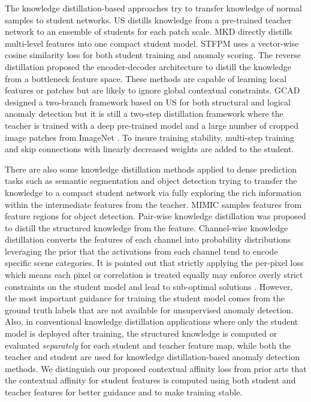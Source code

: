 \documentclass[10pt,twocolumn,letterpaper]{article}
\begin{document}
The knowledge distillation-based approaches try to transfer knowledge of normal samples to student networks. US \cite{bergmann2020uninformed} distills knowledge from a pre-trained teacher network to an ensemble of students for each patch scale. MKD \cite{salehi2021multiresolution} directly distills multi-level features into one compact student model. STFPM \cite{wang2021student} uses a vector-wise cosine similarity loss for both student training and anomaly scoring. The reverse distillation \cite{deng2022anomaly} proposed the encoder-decoder architecture to distill the knowledge from a bottleneck feature space. These methods are capable of learning local features or patches but are likely to ignore global contextual constraints. GCAD \cite{bergmann2022beyond} designed a two-branch framework based on US \cite{bergmann2020uninformed} for both structural and logical anomaly detection but it is still a two-step distillation framework where the teacher is trained with a deep pre-trained model and a large number of cropped image patches from ImageNet \cite{deng2009imagenet}. To insure training stability, multi-step training and skip connections with linearly decreased weights are added to the student.

There are also some knowledge distillation methods applied to dense prediction tasks such as semantic segmentation \cite{long2015fully, zhao2017pyramid} and object detection \cite{lin2017feature} trying to transfer the knowledge to a compact student network via fully exploring the rich information within the intermediate features from the teacher. MIMIC \cite{li2017mimicking} samples features from feature regions for object detection. Pair-wise knowledge distillation \cite{liu2019structured} was proposed to distill the structured knowledge from the feature. Channel-wise knowledge distillation \cite{shu2021channel} converts the features of each channel into probability distributions leveraging the prior that the activations from each channel tend to encode specific scene categories. It is pointed out that strictly applying the per-pixel loss which means each pixel or correlation is treated equally may enforce overly strict constraints on the student model and lead to sub-optimal solutions \cite{shu2021channel}. However, the most important guidance for training the student model comes from the ground truth labels that are not available for unsupervised anomaly detection. Also, in conventional knowledge distillation applications where only the student model is deployed after training, the structured knowledge is computed or evaluated \textit{separately} for each student and teacher feature map, while both the teacher and student are used for knowledge distillation-based anomaly detection methods. We distinguish our proposed contextual affinity loss from prior arts that the contextual affinity for student features is computed using both student and teacher features for better guidance and to make training stable.
\end{document}
